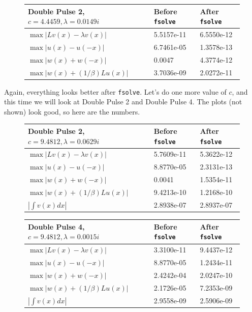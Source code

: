 \documentclass[12pt]{article}
\begin{document}
\begin{figure}[H]
\begin{tabular}{l|l|l}
 Double Pulse 2, $c = 4.4459, \lambda=0.0149i$  & Before \texttt{fsolve} & After \texttt{fsolve} \\ \hline
$\max|Lv(x) - \lambda v(x)|$  & 5.5157e-11 & 6.5550e-12 \\ 
$\max|u(x) - u(-x) |$         & 6.7461e-05 & 1.3578e-13 \\
$\max|w(x) + w(-x) |$         & 0.0047     & 4.3774e-12\\
$\max|w(x) + (1/\beta)Lu(x)|$  & 3.7036e-09 & 2.0272e-11 \\
\end{tabular}
\end{figure}
Again, everything looks better after \texttt{fsolve}. Let's do one more value of $c$, and this time we will look at Double Pulse 2 and Double Pulse 4. The plots (not shown) look good, so here are the numbers.

\begin{figure}[H]
\begin{tabular}{l|l|l}
 Double Pulse 2, $c = 9.4812, \lambda=0.0629i$  & Before \texttt{fsolve} & After \texttt{fsolve} \\ \hline
$\max|Lv(x) - \lambda v(x)|$  & 5.7609e-11 & 5.3622e-12 \\ 
$\max|u(x) - u(-x) |$         & 8.8770e-05 & 2.3131e-13 \\
$\max|w(x) + w(-x) |$         & 0.0041     & 1.5354e-11 \\
$\max|w(x) + (1/\beta)Lu(x)|$ & 9.4213e-10 & 1.2168e-10 \\
$|\int v(x) dx|$              & 2.8938e-07 & 2.8937e-07 \\
\end{tabular}
\end{figure}

\begin{figure}[H]
\begin{tabular}{l|l|l}
 Double Pulse 4, $c = 9.4812, \lambda=0.0015i$  & Before \texttt{fsolve} & After \texttt{fsolve} \\ \hline
$\max|Lv(x) - \lambda v(x)|$  & 3.3100e-11 & 9.4437e-12 \\ 
$\max|u(x) - u(-x) |$         & 8.8770e-05 & 1.2434e-11 \\
$\max|w(x) + w(-x) |$         & 2.4242e-04 & 2.0247e-10 \\
$\max|w(x) + (1/\beta)Lu(x)|$ & 2.1726e-05 & 7.2353e-09 \\
$|\int v(x) dx|$              & 2.9558e-09 & 2.5906e-09 \\
\end{tabular}
\end{figure}
\end{document}

